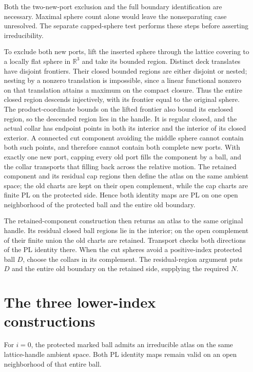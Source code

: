 Both the two-new-port exclusion and the full boundary identification are
necessary. Maximal sphere count alone would leave the nonseparating case
unresolved. The separate capped-sphere test performs these steps before
asserting irreducibility.

To exclude both new ports, lift the
inserted sphere through the lattice covering to a locally flat sphere in
$\mathbb R^3$ and take its bounded region. Distinct deck translates have
disjoint frontiers. Their closed bounded regions are either disjoint or
nested; nesting by a nonzero translation is impossible, since a linear
functional nonzero on that translation attains a maximum on the compact
closure. Thus the entire closed region descends injectively, with its
frontier equal to the original sphere. The product-coordinate bounds on
the lifted frontier also bound its enclosed region, so the descended
region lies in the handle. It is regular closed, and the actual collar has
endpoint points in both its interior and the interior of its closed
exterior. A connected cut component avoiding the middle sphere cannot
contain both such points, and therefore cannot contain both complete new
ports. With exactly one new port, capping every old port fills the component
by a ball, and the collar
transports that filling back across the relative motion. The retained
component and its residual cap regions then define the atlas on the same
ambient space; the old charts are kept on their open complement, while the
cap charts are finite PL on the protected side. Hence both identity maps are
PL on one open neighborhood of the protected ball and the entire old
boundary.

The retained-component construction then returns an atlas to the same
original handle. Its residual closed ball regions lie in the interior;
on the open complement of their finite union the old charts are retained.
Transport checks both directions of the PL identity there. When the cut
spheres avoid a positive-index protected ball $D$, choose the collars in
its complement. The residual-region argument puts $D$ and the entire old
boundary on the retained side, supplying the required $N$.

\section{The three lower-index constructions}
\label{sec:prime-index-cases}

\begin{theorem}
\label{thm:prime-index-zero}
For $i=0$, the protected marked ball admits an irreducible atlas on the
same lattice-handle ambient space. Both PL identity maps remain valid
on an open neighborhood of that entire ball.
\end{theorem}

